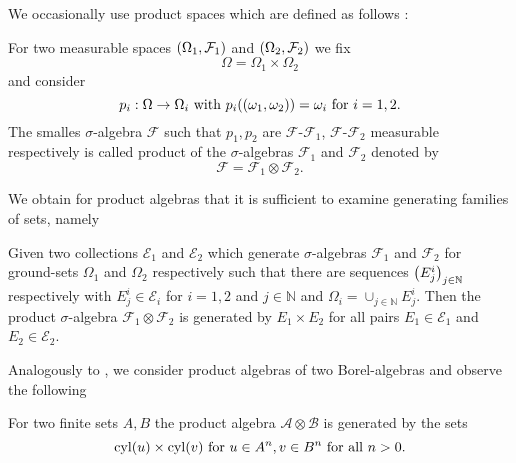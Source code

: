We occasionally use product spaces which are defined as follows 
\cite[Chapter 22]{Bauer}:
\begin{definition}
  For two measurable spaces $\left(\Omega_{1}, \mathcal{F}_{1}\right)$ and 
  $\left(\Omega_{2}, \mathcal{F}_{2}\right)$ we fix
  \begin{equation*}
    \Omega = \Omega_{1}\times\Omega_{2}
  \end{equation*}
  and consider
  \begin{equation*}
    p_{i}:\Omega\rightarrow\Omega_{i}\text{ with }
      p_{i}(\left(\omega_{1}, \omega_{2}\right)) = \omega_{i}\text{ for }i = 1,2.
  \end{equation*}
  The smalles $\sigma$-algebra $\mathcal{F}$ such that $p_{1}, p_{2}$ are 
  $\mathcal{F}$-$\mathcal{F}_{1}$, $\mathcal{F}$-$\mathcal{F}_{2}$ measurable 
  respectively is called product of the $\sigma$-algebras $\mathcal{F}_{1}$ and
  $\mathcal{F}_{2}$ denoted by
  \begin{equation*}
    \mathcal{F} = \mathcal{F}_{1}\otimes\mathcal{F}_{2}.
  \end{equation*}
\end{definition}
We obtain for product algebras that it is sufficient to examine generating
families of sets, namely
\begin{theorem}
  \cite[Theorem 22.1]{Bauer}
  Given two collections $\mathcal{E}_{1}$ and $\mathcal{E}_{2}$ which 
  generate $\sigma$-algebras $\mathcal{F}_{1}$ and $\mathcal{F}_{2}$ for 
  ground-sets $\Omega_{1}$ and $\Omega_{2}$ respectively such that there are
  sequences $\left(E^{i}_{j}\right)_{j\in\mathbb{N}}$ respectively with 
  $E^{i}_{j}\in\mathcal{E}_{i}$ for $i = 1,2$ and $j\in\mathbb{N}$ and 
  $\Omega_{i} = \cup_{j\in\mathbb{N}}E_{j}^{i}$. Then the product 
  $\sigma$-algebra $\mathcal{F}_{1}\otimes\mathcal{F}_{2}$ is generated by 
  $E_{1}\times E_{2}$ for all pairs $E_{1}\in\mathcal{E}_{1}$ and 
  $E_{2}\in\mathcal{E}_{2}$. 
  \label{thm:productgen}
\end{theorem}
Analogously to \cite[Remark 35]{RandAutoInfTrees}, we consider product algebras
of two Borel-algebras and observe the following
\begin{lemma}
  For two finite sets $A, B$ the product algebra
  $\mathcal{A}\otimes\mathcal{B}$ is generated by the sets
  \begin{equation*}
    \operatorname{cyl}(u)\times\operatorname{cyl}(v)\text{ for }u\in A^{n}, v\in B^{n}\text{ for all }n>0.
  \end{equation*}
  \label{lem:productborelalgebras}
\end{lemma}
